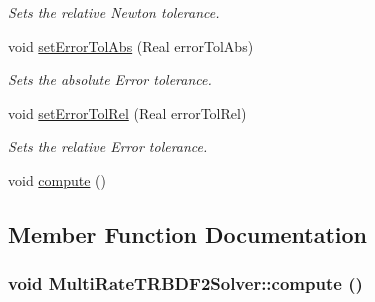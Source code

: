 \begin{DoxyCompactItemize}
\begin{DoxyCompactList}\small\item\em Sets the relative Newton tolerance. \item\end{DoxyCompactList}\item 
\hypertarget{classMultiRateTRBDF2Solver_a43c3ea4cdada6de697ab40d85c1ad98b}{
void \hyperlink{classMultiRateTRBDF2Solver_a43c3ea4cdada6de697ab40d85c1ad98b}{setErrorTolAbs} (Real errorTolAbs)}
\label{classMultiRateTRBDF2Solver_a43c3ea4cdada6de697ab40d85c1ad98b}

\begin{DoxyCompactList}\small\item\em Sets the absolute Error tolerance. \item\end{DoxyCompactList}\item 
\hypertarget{classMultiRateTRBDF2Solver_aeb42ae9c8fd687d080987d2b19b28c4a}{
void \hyperlink{classMultiRateTRBDF2Solver_aeb42ae9c8fd687d080987d2b19b28c4a}{setErrorTolRel} (Real errorTolRel)}
\label{classMultiRateTRBDF2Solver_aeb42ae9c8fd687d080987d2b19b28c4a}

\begin{DoxyCompactList}\small\item\em Sets the relative Error tolerance. \item\end{DoxyCompactList}\item 
void \hyperlink{classMultiRateTRBDF2Solver_af938aabdcfc8c26f802fa648812e83cc}{compute} ()
\end{DoxyCompactItemize}


\subsection{Member Function Documentation}
\hypertarget{classMultiRateTRBDF2Solver_af938aabdcfc8c26f802fa648812e83cc}{
\subsubsection[{compute}]{\setlength{\rightskip}{0pt plus 5cm}void MultiRateTRBDF2Solver::compute ()}}
\label{classMultiRateTRBDF2Solver_af938aabdcfc8c26f802fa648812e83cc}


